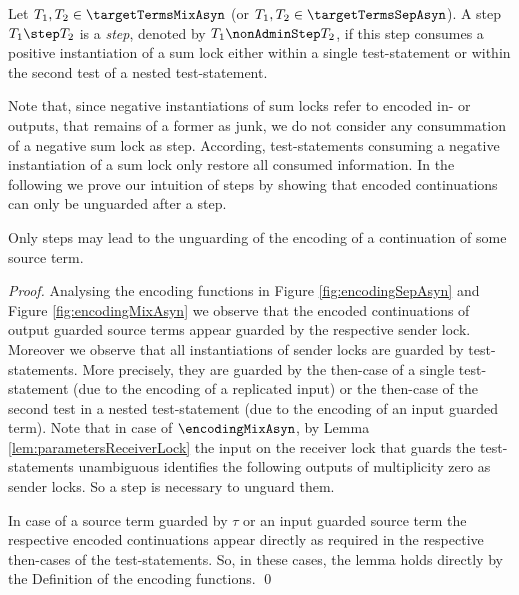 \documentclass[]{llncs}
\begin{document}
\begin{definition} \label{def:nonAdminStep}
	Let $ T_1, T_2 \in \targetTermsMixAsyn $ (or $ T_1, T_2 \in \targetTermsSepAsyn $). A step $ T_1 \step T_2 $ is a \emph{\nonAdmin step}, denoted by $ T_1 \nonAdminStep T_2 $, if this step consumes a positive instantiation of a sum lock either within a single test-statement or within the second test of a nested test-statement.
\end{definition}

Note that, since negative instantiations of sum locks refer to encoded in- or outputs, that remains of a former \simulation as junk, we do not consider any consummation of a negative sum lock as \nonAdmin step. According, test-statements consuming a negative instantiation of a sum lock only restore all consumed information. In the following we prove our intuition of \nonAdmin steps by showing that encoded continuations can only be unguarded after a \nonAdmin step.

\begin{lemma} \label{lem:nonAdminStepContinuation}
	Only \nonAdmin steps may lead to the unguarding of the encoding of a continuation of some source term.
\end{lemma}

\begin{proof}
	Analysing the encoding functions in Figure \ref{fig:encodingSepAsyn} and Figure \ref{fig:encodingMixAsyn} we observe that the encoded continuations of output guarded source terms appear guarded by the respective sender lock. Moreover we observe that all instantiations of sender locks are guarded by test-statements. More precisely, they are guarded by the then-case of a single test-statement (due to the encoding of a replicated input) or the then-case of the second test in a nested test-statement (due to the encoding of an input guarded term). Note that in case of $ \encodingMixAsyn $, by Lemma \ref{lem:parametersReceiverLock} the input on the receiver lock that guards the test-statements unambiguous identifies the following outputs of multiplicity zero as sender locks. So a \nonAdmin step is necessary to unguard them.
	
	In case of a source term guarded by $ \tau $ or an input guarded source term the respective encoded continuations appear directly as required in the respective then-cases of the test-statements. So, in these cases, the lemma holds directly by the Definition of the encoding functions.
	\qed
\end{proof}
\end{document}
